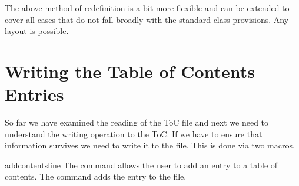 The above method of redefinition is a bit more flexible and can be extended to cover all cases that do not fall broadly with the standard class provisions. Any layout is possible.


\section{Writing the Table of Contents Entries}

So far we have examined the reading of the ToC file and next we need to understand the writing operation
to the ToC. If we have to ensure that information survives we need to write it to the file. This is done via two macros.


\begin{docCommand}{addcontentsline}{}
The  command allows the user to add an entry to a table of contents. The command adds the entry
 to the  file.
\end{docCommand}



\begin{teX}       
 \long{}
\end{teX}

\begin{teX}
\def\addcontentsline#1#2#3{%
  \addtocontents{#1}{\protect\contentsline{#2}{#3}{\thepage}}}

\def\contentsline#1{\csname l@#1\endcsname}
\end{teX}



